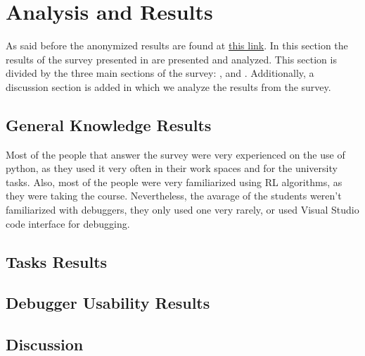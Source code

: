
\chapter{Analysis and Results}
\label{cha:results}
As said before the anonymized results are found at \href{https://uniandes-my.sharepoint.com/:x:/g/personal/la_rodriguez_uniandes_edu_co/ESDy89Q-PgVBpYHEZ_CDh_IBhjhS35VFqNrlEjVw_ShY1w?e=lm319K}{this link}.
In this section the results of the survey presented in  are presented and analyzed. This section 
is divided by the three main sections of the survey: ,  and 
. Additionally, a discussion  section is added in which we analyze the results 
from the survey.

\section{General Knowledge Results}
\label{sec:general-knowledge}
Most of the people that answer the survey were very experienced on the use of python, as they used it very often in 
their work spaces and for the university tasks. Also, most of the people were very familiarized using \ac{RL} algorithms,
as they were taking the course. Nevertheless, the avarage of the students weren't familiarized with 
debuggers, they only used one very rarely, or used Visual Studio code interface for debugging.

\section{Tasks Results}
\label{sec:tasks-results}

\section{Debugger Usability Results}
\label{sec:usability}

\section{Discussion}
\label{sec:discussion}


\endinput

